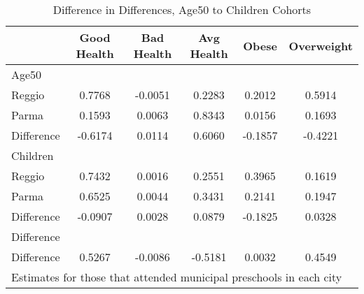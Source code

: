 \begin{table}[htbp]\centering
\caption{Difference in Differences, Age50 to Children Cohorts}
\begin{tabular}{l*{5}{c}}
\hline\hline
            & Good Health&  Bad Health&  Avg Health&       Obese&  Overweight\\
\hline
Age50       &            &            &            &            &            \\
Reggio      &      0.7768&     -0.0051&      0.2283&      0.2012&      0.5914\\
Parma       &      0.1593&      0.0063&      0.8343&      0.0156&      0.1693\\
Difference  &     -0.6174&      0.0114&      0.6060&     -0.1857&     -0.4221\\
\hline
Children    &            &            &            &            &            \\
Reggio      &      0.7432&      0.0016&      0.2551&      0.3965&      0.1619\\
Parma       &      0.6525&      0.0044&      0.3431&      0.2141&      0.1947\\
Difference  &     -0.0907&      0.0028&      0.0879&     -0.1825&      0.0328\\
\hline
Difference  &            &            &            &            &            \\
Difference  &      0.5267&     -0.0086&     -0.5181&      0.0032&      0.4549\\
\hline\hline
\multicolumn{6}{l}{\footnotesize Estimates for those that attended municipal preschools in each city}\\
\end{tabular}
\end{table}

